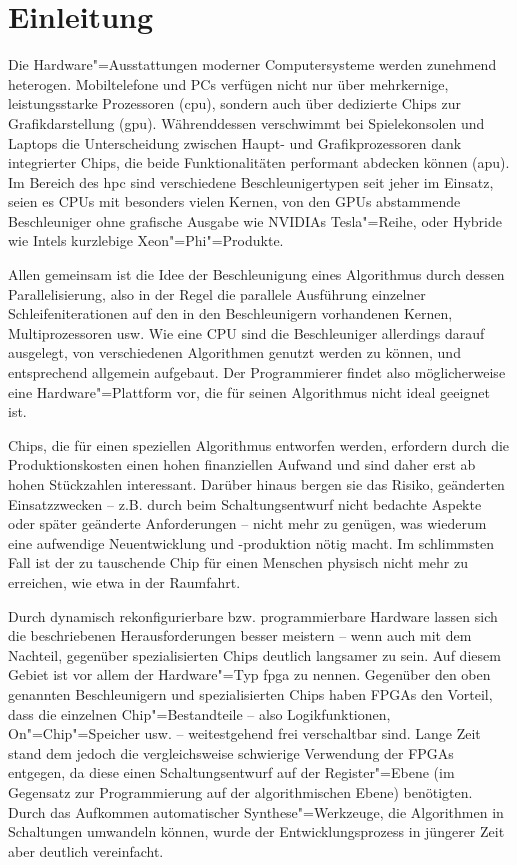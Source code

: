 \chapter{Einleitung}\label{einleitung}

Die Hardware"=Ausstattungen moderner Computersysteme werden zunehmend heterogen.
Mobiltelefone und PCs verfügen nicht nur über mehrkernige, leistungsstarke
Prozessoren (\gls{cpu}), sondern auch über dedizierte Chips zur
Grafikdarstellung (\gls{gpu}). Währenddessen verschwimmt bei Spielekonsolen und
Laptops die Unterscheidung zwischen Haupt- und Grafikprozessoren dank
integrierter Chips, die beide Funktionalitäten performant abdecken können
(\gls{apu}). Im Bereich des \gls{hpc} sind verschiedene Beschleunigertypen seit
jeher im Einsatz, seien es CPUs mit besonders vielen Kernen, von den GPUs
abstammende Beschleuniger ohne grafische Ausgabe wie NVIDIAs Tesla"=Reihe, oder
Hybride wie Intels kurzlebige Xeon"=Phi"=Produkte.

Allen gemeinsam ist die Idee der Beschleunigung eines Algorithmus durch dessen
Parallelisierung, also in der Regel die parallele Ausführung einzelner Schleifeniterationen
auf den in den Beschleunigern vorhandenen Kernen, Multiprozessoren usw. Wie eine
CPU sind die Beschleuniger allerdings darauf ausgelegt, von verschiedenen
Algorithmen genutzt werden zu können, und entsprechend allgemein aufgebaut. Der
Programmierer findet also möglicherweise eine Hardware"=Plattform vor, die für
seinen Algorithmus nicht ideal geeignet ist.

Chips, die für einen speziellen Algorithmus entworfen werden, erfordern durch
die Produktionskosten einen hohen finanziellen Aufwand und sind daher erst ab
hohen Stückzahlen interessant. Darüber hinaus bergen sie das Risiko, geänderten
Einsatzzwecken -- z.B. durch beim Schaltungsentwurf nicht bedachte Aspekte oder
später geänderte Anforderungen -- nicht mehr zu genügen, was wiederum eine
aufwendige Neuentwicklung und -produktion nötig macht. Im schlimmsten Fall ist
der zu tauschende Chip für einen Menschen physisch nicht mehr zu erreichen, wie
etwa in der Raumfahrt.

Durch dynamisch rekonfigurierbare bzw. programmierbare Hardware lassen sich die
beschriebenen Herausforderungen besser meistern -- wenn auch mit dem Nachteil,
gegenüber spezialisierten Chips deutlich langsamer zu sein. Auf diesem Gebiet
ist vor allem der Hardware"=Typ \gls{fpga} zu nennen. Gegenüber den oben
genannten Beschleunigern und spezialisierten Chips haben FPGAs den Vorteil, dass
die einzelnen Chip"=Bestandteile -- also Logikfunktionen, On"=Chip"=Speicher
usw. -- weitestgehend frei verschaltbar sind. 
Lange Zeit stand dem jedoch die vergleichsweise schwierige Verwendung der
FPGAs entgegen, da diese einen Schaltungsentwurf auf der Register"=Ebene (im
Gegensatz zur Programmierung auf der algorithmischen Ebene) benötigten. Durch
das Aufkommen automatischer Synthese"=Werkzeuge, die Algorithmen in Schaltungen
umwandeln können, wurde der Entwicklungsprozess in jüngerer Zeit
aber deutlich vereinfacht.

